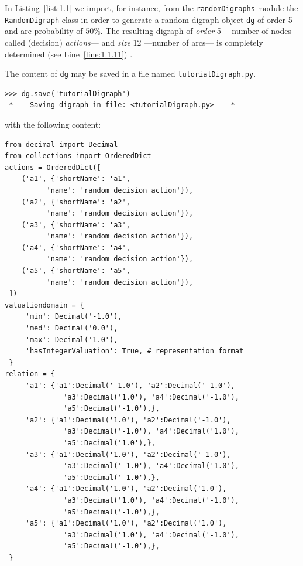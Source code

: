 In Listing~\vref{list:1.1}  we import, for instance, from the \texttt{randomDigraphs} module the \texttt{RandomDigraph} class  in order to generate a random digraph object \texttt{dg} of order 5 and arc probability of $50\%$. The resulting digraph of \emph{order} 5 ---number of nodes called (decision) \emph{actions}--- and \emph{size} 12 ---number of arcs--- is completely determined (see Line~\ref{line:1.1.11}) .

The content of \texttt{dg} may be saved in a file named \texttt{tutorialDigraph.py}.
\begin{lstlisting}
>>> dg.save('tutorialDigraph')
 *--- Saving digraph in file: <tutorialDigraph.py> ---*
\end{lstlisting}
with the following content:
\begin{lstlisting}[caption={A stored digraph instance},label=list:1.2]
from decimal import Decimal
from collections import OrderedDict
actions = OrderedDict([
    ('a1', {'shortName': 'a1',
          'name': 'random decision action'}),
    ('a2', {'shortName': 'a2',
          'name': 'random decision action'}),
    ('a3', {'shortName': 'a3',
          'name': 'random decision action'}),
    ('a4', {'shortName': 'a4',
          'name': 'random decision action'}),
    ('a5', {'shortName': 'a5',
          'name': 'random decision action'}),
 ])
valuationdomain = {
     'min': Decimal('-1.0'),
     'med': Decimal('0.0'),
     'max': Decimal('1.0'),
     'hasIntegerValuation': True, # representation format
 }
relation = {
     'a1': {'a1':Decimal('-1.0'), 'a2':Decimal('-1.0'),
              'a3':Decimal('1.0'), 'a4':Decimal('-1.0'),
              'a5':Decimal('-1.0'),},
     'a2': {'a1':Decimal('1.0'), 'a2':Decimal('-1.0'),
              'a3':Decimal('-1.0'), 'a4':Decimal('1.0'),
              'a5':Decimal('1.0'),},
     'a3': {'a1':Decimal('1.0'), 'a2':Decimal('-1.0'),
              'a3':Decimal('-1.0'), 'a4':Decimal('1.0'),
              'a5':Decimal('-1.0'),},
     'a4': {'a1':Decimal('1.0'), 'a2':Decimal('1.0'),
              'a3':Decimal('1.0'), 'a4':Decimal('-1.0'),
              'a5':Decimal('-1.0'),},
     'a5': {'a1':Decimal('1.0'), 'a2':Decimal('1.0'),
              'a3':Decimal('1.0'), 'a4':Decimal('-1.0'),
              'a5':Decimal('-1.0'),},
 }
\end{lstlisting}


